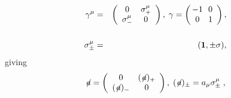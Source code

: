 \begin{article}
\setcounter{equation}{0}




\begin{mathletters}
   \begin{eqnarray}
      \gamma^\mu & = & \left(\begin{array}{cc} 0 & 
      \sigma^\mu_+ \\ 
      \sigma^\mu_- & 0 \end{array} \right), 
      \;\gamma = \left( \begin{array}{cc} 
      \! \! -1 & \! \! 0 \\ \! \! 0 & \! \! 1  
      \end{array} \right), \\ & & \nonumber \\
      \sigma^\mu_{\pm} & = & ({\bf 1} ,\pm \sigma),
   \end{eqnarray}
giving 
   \begin{eqnarray}
      \not\!a= \left(\begin{array}{cc}0 & 
      (\not\!a)_+\\(\not\!a)_- & 
      0\end{array}\right), 
      \;(\not\!a)_\pm=a_\mu\sigma^\mu_\pm\;,
   \end{eqnarray}
\end{mathletters}


\end{article}

